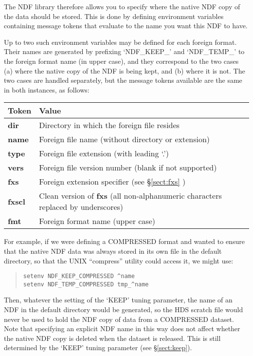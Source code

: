 The NDF library therefore allows you to specify where the native NDF
copy of the data should be stored. This is done by defining
environment variables containing message tokens that evaluate to the
name you want this NDF to have.

Up to two such environment variables may be defined for each foreign
format. Their names are generated by prefixing `NDF\_KEEP\_' and
`NDF\_TEMP\_' to the foreign format name (in upper case), and they
correspond to the two cases (a) where the native copy of the NDF is
being kept, and (b) where it is not. The two cases are handled
separately, but the message tokens available are the same in both
instances, as follows:

\begin{center}
\begin{tabular}{|l|l|}
\hline
{\bf Token} & {\bf Value}\\
\hline\hline
{\bf dir}  & Directory in which the foreign file resides\\
{\bf name} & Foreign file name (without directory or extension)\\
{\bf type} & Foreign file extension (with leading `.')\\
{\bf vers} & Foreign file version number (blank if not supported)\\
{\bf fxs}  & Foreign extension specifier (see \S\ref{sect:fxs} )\\
{\bf fxscl} & Clean version of {\bf fxs} (all non-alphanumeric characters
replaced by underscores)\\
{\bf fmt}  & Foreign format name (upper case)\\
\hline
\end{tabular}
\end{center}

For example, if we were defining a COMPRESSED format and wanted to
ensure that the native NDF data was always stored in its own file in
the default directory, so that the UNIX ``compress'' utility could
access it, we might use:

\begin{quote}
\begin{small}
\begin{verbatim}
setenv NDF_KEEP_COMPRESSED ^name
setenv NDF_TEMP_COMPRESSED tmp_^name
\end{verbatim}
\end{small}
\end{quote}

Then, whatever the setting of the `KEEP' tuning parameter, the name of
an NDF in the default directory would be generated, so the HDS scratch
file would never be used to hold the NDF copy of data from a
COMPRESSED dataset.  Note that specifying an explicit NDF name in this
way does not affect whether the native NDF copy is deleted when the
dataset is released. This is still determined by the `KEEP' tuning
parameter (see \S\ref{sect:keep}).

